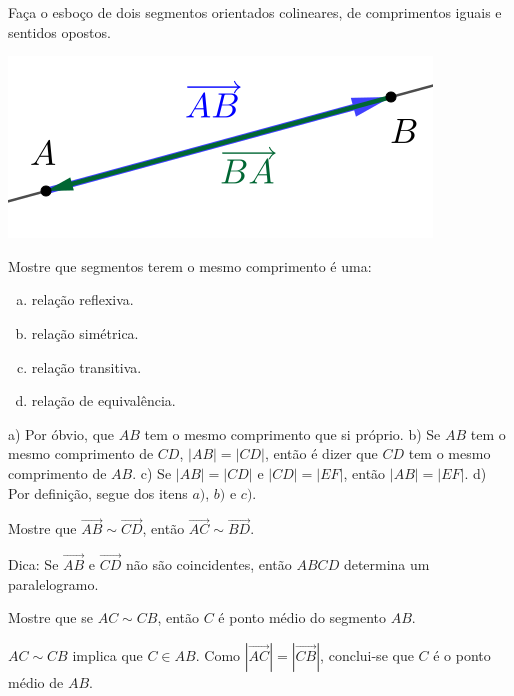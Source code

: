 \begin{exer}\label{cap_vetor_sec_segorien:fig:exer_segs_hn_s}
  Faça o esboço de dois segmentos orientados colineares, de comprimentos iguais e sentidos opostos.
\end{exer}
\begin{resp}
  
  \includegraphics{./cap_vetor/dados/fig_exer_segs_hn_s/fig.png}
\end{resp}

\begin{exer}
  Mostre que segmentos terem o mesmo comprimento é uma:
  \begin{enumerate}[a)]
    \item relação reflexiva.
    \item relação simétrica.
    \item relação transitiva.
    \item relação de equivalência.
  \end{enumerate}
\end{exer}
\begin{resp}
  a) Por óbvio, que $AB$ tem o mesmo comprimento que si próprio. b) Se $AB$ tem o mesmo comprimento de $CD$, $|AB| = |CD|$, então é dizer que $CD$ tem o mesmo comprimento de $AB$. c) Se $|AB| = |CD|$ e $|CD| = |EF|$, então $|AB| = |EF|$. d) Por definição, segue dos itens $a)$, $b)$ e $c)$.
\end{resp}

\begin{exer}
  Mostre que $\overrightarrow{AB}\sim \overrightarrow{CD}$, então $\overrightarrow{AC}\sim \overrightarrow{BD}$.
\end{exer}
\begin{resp}
  Dica: Se $\overrightarrow{AB}$ e $\overrightarrow{CD}$ não são coincidentes, então $ABCD$ determina um paralelogramo.
\end{resp}

\begin{exer}
  Mostre que se $AC\sim CB$, então $C$ é ponto médio do segmento $AB$.
\end{exer}
\begin{resp}
  $AC\sim CB$ implica que $C\in AB$. Como $\left|\overrightarrow{AC}\right| = \left|\overrightarrow{CB}\right|$, conclui-se que $C$ é o ponto médio de $AB$.
\end{resp}

